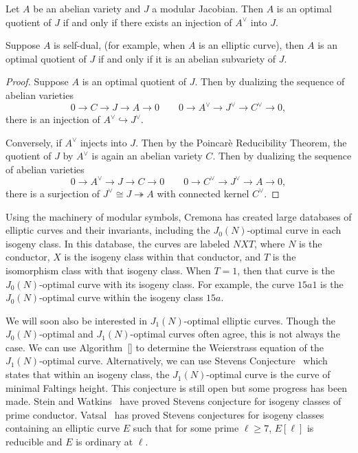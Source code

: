 \documentclass[11pt, proquest]{uwthesis}
\begin{document}
\begin{proposition}
    \label{prop:optimal}
    Let $A$ be an abelian variety and $J$ a modular Jacobian. Then $A$ is an
    optimal quotient of $J$ if and only if there exists an injection of
    $A^\vee$ into $J$.

    Suppose $A$ is self-dual, (for example, when $A$ is an elliptic curve), then
    $A$ is an optimal quotient of $J$ if and only if it is an abelian
    subvariety of $J$.
\end{proposition}
\begin{proof}
    Suppose $A$ is an optimal quotient of $J$. Then by dualizing the sequence
    of abelian varieties~\cite[Proposition 2.4.2]{lange-birkenhake:complex}
    \[
        0 \to C \to J \to A \to 0 \qquad
        0\to A^\vee \to J^\vee \to C^\vee \to 0,
    \]
    there is an injection of $A^\vee\hookrightarrow J^\vee$.

    Conversely, if $A^\vee$ injects into $J$. Then by the Poincar\`{e} Reducibility
    Theorem, the quotient of $J$ by $A^\vee$ is again an abelian variety $C$.
    Then by dualizing the sequence of abelian varieties
    \[
        0 \to A^\vee \to J \to C \to 0 \qquad
        0 \to C^\vee \to J^\vee \to A \to 0,
    \]
    there is a surjection of $J^\vee\cong J\twoheadrightarrow A$ with connected
    kernel $C^\vee$.
\end{proof}

Using the machinery of modular symbols, Cremona has created large databases of
elliptic curves and their invariants, including the $J_0(N)$-optimal curve in
each isogeny class. In this database, the curves are labeled $NXT$, where $N$
is the conductor, $X$ is the isogeny class within that conductor, and $T$ is
the isomorphism class with that isogeny class. When $T=1$, then that curve is
the $J_0(N)$-optimal curve with its isogeny class. For example, the curve
$15a1$ is the $J_0(N)$-optimal curve within the isogeny class $15a$.

We will soon also be interested in $J_1(N)$-optimal elliptic curves. Though the
$J_0(N)$-optimal and $J_1(N)$-optimal curves often agree, this is not always
the case. We can use Algorithm~\ref{} to determine the Weierstrass equation of
the $J_1(N)$-optimal curve. Alternatively, we can use Stevens
Conjecture~\cite[Conjecture II]{stevens:param} which states that within an
isogeny class, the $J_1(N)$-optimal curve is the curve of minimal Faltings
height. This conjecture is still open but some progress has been made. Stein
and Watkins~\cite[\S 3]{stein-watkins:ns} have proved Stevens conjecture for
isogeny classes of prime conductor. Vatsal~\cite[Thm.
1.11]{vatsal:multiplicative} has proved Stevens conjectures for isogeny classes
containing an elliptic curve $E$ such that for some prime $\ell\geq 7$,
$E[\ell]$ is reducible and $E$ is ordinary at $\ell$.
\end{document}
